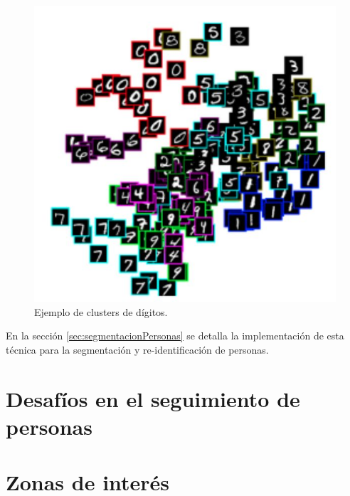 \begin{figure}[ht]
	\centering
	\includegraphics[scale=0.7]{./Figures/clusterDigitos.jpg}
	\caption{Ejemplo de clusters de dígitos.}
	\label{fig:clusterDigitos}
\end{figure}

En la sección \ref{sec:segmentacionPersonas} se detalla la implementación de esta técnica para la segmentación y re-identificación de personas.

\newpage


\section{Desafíos en el seguimiento de personas}
\label{sec:desafiosSeguimiento}


\section{Zonas de interés}
\label{sec:zonasInteres}
